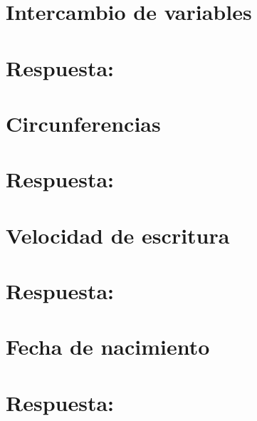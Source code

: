 \section{Intercambio de variables}

\ifshowanswers
\section*{Respuesta:}

\fi

\section{Circunferencias}

\ifshowanswers
\section*{Respuesta:}

\fi

\section{Velocidad de escritura}

\ifshowanswers
\section*{Respuesta:}

\fi

\section{Fecha de nacimiento}

\ifshowanswers
\section*{Respuesta:}

\fi